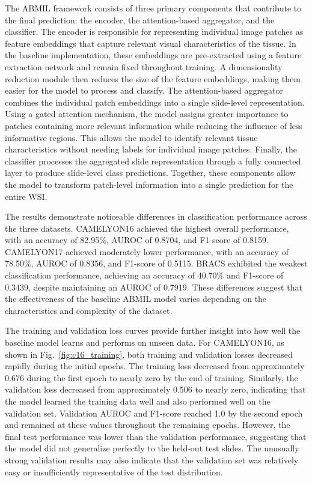\documentclass[journal]{IEEEtran}
\begin{document}
The ABMIL framework consists of three primary components that contribute to the final prediction: the encoder, the attention-based aggregator, and the classifier. The encoder is responsible for representing individual image patches as feature embeddings that capture relevant visual characteristics of the tissue. In the baseline implementation, these embeddings are pre-extracted using a feature extraction network and remain fixed throughout training. A dimensionality reduction module then reduces the size of the feature embeddings, making them easier for the model to process and classify. The attention-based aggregator combines the individual patch embeddings into a single slide-level representation. Using a gated attention mechanism, the model assigns greater importance to patches containing more relevant information while reducing the influence of less informative regions.
This allows the model to identify relevant tissue characteristics without needing labels for individual image patches. Finally, the classifier processes the aggregated slide representation through a fully connected layer to produce slide-level class predictions. Together, these components allow the model to transform patch-level information into a single prediction for the entire WSI.

The results demonstrate noticeable differences in classification performance across the three datasets. CAMELYON16 achieved the highest overall performance, with an accuracy of 82.95\%, AUROC of 0.8704, and F1-score of 0.8159. CAMELYON17 achieved moderately lower performance, with an accuracy of 78.50\%, AUROC of 0.8356, and F1-score of 0.5115. BRACS exhibited the weakest classification performance, achieving an accuracy of 40.70\% and F1-score of 0.3439, despite maintaining an AUROC of 0.7919. These differences suggest that the effectiveness of the baseline ABMIL model varies depending on the characteristics and complexity of the dataset.

The training and validation loss curves provide further insight into how well the baseline model learns and performs on unseen data. For CAMELYON16, as shown in Fig.~\ref{fig:c16_training}, both training and validation losses decreased rapidly during the initial epochs. The training loss decreased from approximately 0.676 during the first epoch to nearly zero by the end of training. Similarly, the validation loss decreased from approximately 0.506 to nearly zero, indicating that the model learned the training data well and also performed well on the validation set. Validation AUROC and F1-score reached 1.0 by the second epoch and remained at these values throughout the remaining epochs. However, the final test performance was lower than the validation performance, suggesting that the model did not generalize perfectly to the held-out test slides. The unusually strong validation results may also indicate that the validation set was relatively easy or insufficiently representative of the test distribution.
\end{document}
